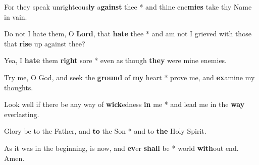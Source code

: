 \begin{multicols}{2}
	For they speak unrighteous\textbf{ly} a\textbf{gainst} thee * and thine ene\textbf{mies} take thy Name in vain.
	
	Do not I hate them, O \textbf{Lord}, that \textbf{hate} thee * and am not I grieved with those that \textbf{rise} up against thee?
	
	Yea, I \textbf{hate} them \textbf{right} sore * even as though \textbf{they} were mine enemies.
	
	Try me, O God, and seek the \textbf{ground} of \textbf{my} heart * prove me, and \textbf{ex}amine my thoughts.
	
	Look well if there be any way of \textbf{wick}edness \textbf{in} me * and lead me in the \textbf{way} everlasting.
	
	Glory be to the Father, and \textbf{to} the Son * and to \textbf{the} Holy Spirit.
	
	As it was in the beginning, is now, and \textbf{ev}er \textbf{shall} be * world \textbf{with}out end. Amen.
\end{multicols}
